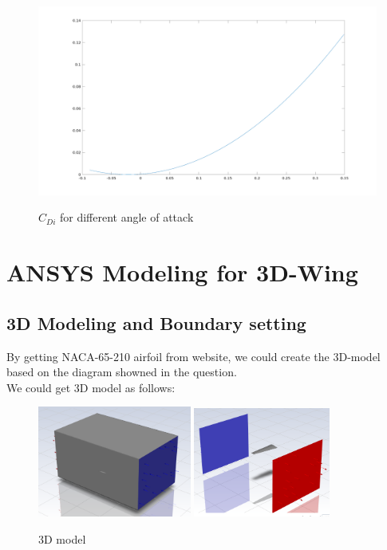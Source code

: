 \documentclass[12pt]{article}
\begin{document}
\begin{figure}[H]
    \centering
    \includegraphics[width=1\textwidth]{Latex/figure/Cdi.png}
    \label{IGs.jpg}
    \caption{$C_{Di}$ for different angle of attack}
\end{figure}


\section{ANSYS Modeling for 3D-Wing}


\subsection{3D Modeling and Boundary setting}

By getting NACA-65-210 airfoil from website, we could create the 3D-model based on the diagram showned in the question.\\

We could get 3D model as follows:
\begin{figure}[H]
    \centering
    \includegraphics[width=0.45\textwidth]{Latex/figure/3D-Model.png}
    \includegraphics[width=0.4\textwidth]{Latex/figure/3D-wing.png}
    \label{IGs.jpg}
    \caption{3D model}
\end{figure}
\end{document}
